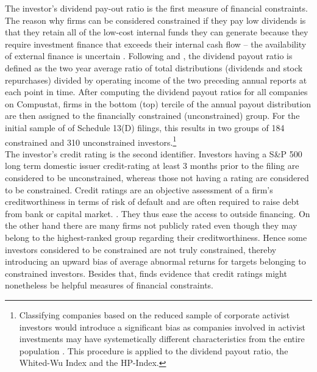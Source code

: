 \documentclass[12pt]{article}
\begin{document}
The investor's dividend pay-out ratio is the first measure of financial constraints. The reason why firms can be considered constrained if they pay low dividends is that they retain all of the low-cost internal funds they can generate because they require investment finance that exceeds their internal cash flow  -- the availability of external finance is uncertain \citep[p.158]{Fazzari1988}. Following \citet{Almeida2004} and \citet[p.119]{Khatami2014}, the dividend payout ratio is defined as the two year average ratio of total distributions (dividends and stock repurchases) divided by operating income of the two preceding annual reports at each point in time. After computing the dividend payout ratios for all companies on Compustat, firms in the bottom (top) tercile of the annual payout distribution are then assigned to the financially constrained (unconstrained) group. For the initial sample of of Schedule 13(D) filings, this results in two groups of 184 constrained and 310 unconstrained investors.\footnote{Classifying companies based on the reduced sample of corporate activist investors would introduce a significant bias as companies involved in activist investments may have systemetically different characteristics from the entire population \citep[p.109]{Khatami2014}. This procedure is applied to the dividend payout ratio, the Whited-Wu Index and the HP-Index.}\\
The investor's credit rating is the second identifier. Investors having a S\&P 500 long term domestic issuer credit-rating at least 3 months prior to the filing are considered to be unconstrained, whereas those not having a rating are considered to be constrained. Credit ratings are an objective assessment of a firm's creditworthiness in terms of risk of default and are often required to raise debt from bank or capital market. \citep[p.18]{heller2015}. They thus ease the access to outside financing. On the other hand there are many firms not publicly rated even though they may belong to the highest-ranked group regarding their creditworthiness. Hence some investors considered to be constrained are not truly constrained, thereby introducing an upward bias of average abnormal returns for targets belonging to constrained investors. Besides that, \citet[p.175]{heller2015} finds evidence that credit ratings might nonetheless be helpful measures of financial constraints. 
\end{document}
